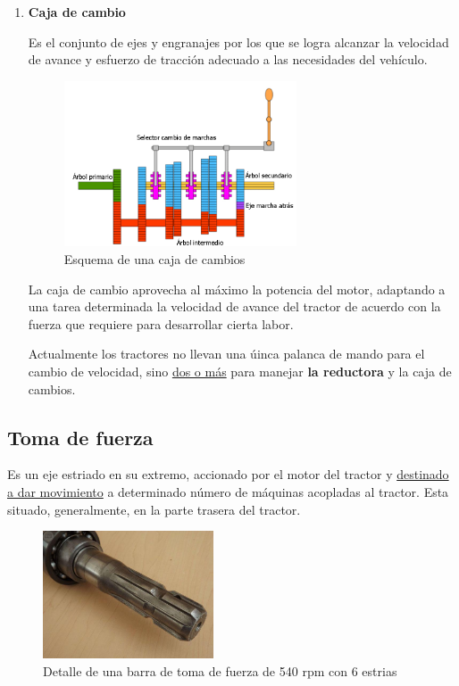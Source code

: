 \documentclass[a4paper,12pt,oneside]{book}
\begin{document}
\begin{enumerate}
\item \textbf{Caja de cambio}
\label{sec:orgc13b580}

Es el conjunto de ejes y engranajes por los que se logra alcanzar la velocidad
de avance y esfuerzo de tracción adecuado a las necesidades del vehículo.
\begin{figure}[htbp]
\centering
\includegraphics[width=0.65\textwidth]{./img_0009/caja_cambio.jpg}
\caption{Esquema de una caja de cambios}
\end{figure}

La caja de cambio aprovecha al máximo la potencia del motor, adaptando a una
tarea determinada la velocidad de avance del tractor de acuerdo con la fuerza
que requiere para desarrollar cierta labor.

Actualmente los tractores no llevan una úinca palanca de mando para el cambio de
velocidad, sino \uline{dos o más} para manejar \textbf{la reductora} y la caja de cambios.
\end{enumerate}

\subsection{Toma de fuerza}
\label{sec:orgee1139c}
Es un eje estriado en su extremo, accionado por el motor del tractor y
\uline{destinado a dar movimiento} a determinado número de máquinas acopladas al
tractor. Esta situado, generalmente, en la parte trasera del tractor.
\begin{figure}[htbp]
\centering
\includegraphics[width=0.45\textwidth]{./img_0009/toma_fuerza_2.jpg}
\caption{Detalle de una barra de toma de fuerza de 540 rpm con 6 estrias}
\end{figure}
\end{document}
